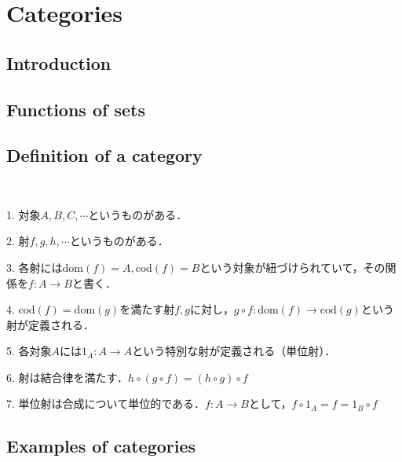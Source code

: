 \documentclass[uplatex, 12pt, dvipdfmx]{jsarticle}
\title{}
\author{司馬博文 J4-190549\\hirofumi-shiba48@g.ecc.u-tokyo.ac.jp}
\date{\today}
\begin{document}
\tableofcontents

\section{Categories}

\subsection{Introduction}
\subsection{Functions of sets}
\subsection{Definition of a category}
\begin{definition}[Category]　

    1. 対象$A,B,C,\cdots$というものがある．

    2. 射$f,g,h,\cdots$というものがある．

    3. 各射には$\mathrm{dom}(f)=A, \mathrm{cod}(f)=B$という対象が紐づけられていて，その関係を$f:A\to B$と書く．

    4. $\mathrm{cod}(f)=\mathrm{dom}(g)$を満たす射$f,g$に対し，$g\circ f:\mathrm{dom}(f)\to \mathrm{cod}(g)$という射が定義される．

    5. 各対象$A$には$1_A:A\to A$という特別な射が定義される（単位射）．

    6. 射は結合律を満たす．$h\circ (g\circ f)=(h\circ g)\circ f$

    7. 単位射は合成について単位的である．$f:A\to B$として，$f\circ 1_A=f=1_B\circ f$
\end{definition}

\subsection{Examples of categories}
\end{document}
